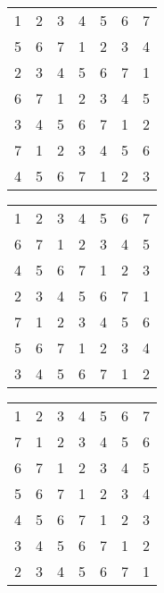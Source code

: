 \documentclass{article}
\begin{document}
\begin{minipage}{.5\textwidth}
\begin{tabular}{ccccccc}
	1 & 2 & 3 & 4 & 5 & 6 & 7\\
	5 & 6 & 7 & 1 & 2 & 3 & 4\\
	2 & 3 & 4 & 5 & 6 & 7 & 1\\
	6 & 7 & 1 & 2 & 3 & 4 & 5\\
	3 & 4 & 5 & 6 & 7 & 1 & 2\\
	7 & 1 & 2 & 3 & 4 & 5 & 6\\
	4 & 5 & 6 & 7 & 1 & 2 & 3\\
\end{tabular}
\end{minipage}
\newline
\newline
\newline
\begin{minipage}{.5\textwidth}
\begin{tabular}{ccccccc}
	1 & 2 & 3 & 4 & 5 & 6 & 7\\
	6 & 7 & 1 & 2 & 3 & 4 & 5\\
	4 & 5 & 6 & 7 & 1 & 2 & 3\\
	2 & 3 & 4 & 5 & 6 & 7 & 1\\
	7 & 1 & 2 & 3 & 4 & 5 & 6\\
	5 & 6 & 7 & 1 & 2 & 3 & 4\\
	3 & 4 & 5 & 6 & 7 & 1 & 2\\
\end{tabular}
\end{minipage}
\begin{minipage}{.5\textwidth}
\begin{tabular}{ccccccc}
	1 & 2 & 3 & 4 & 5 & 6 & 7\\
	7 & 1 & 2 & 3 & 4 & 5 & 6\\
	6 & 7 & 1 & 2 & 3 & 4 & 5\\
	5 & 6 & 7 & 1 & 2 & 3 & 4\\
	4 & 5 & 6 & 7 & 1 & 2 & 3\\
	3 & 4 & 5 & 6 & 7 & 1 & 2\\
	2 & 3 & 4 & 5 & 6 & 7 & 1\\
\end{tabular}
\end{minipage}
\end{document}
